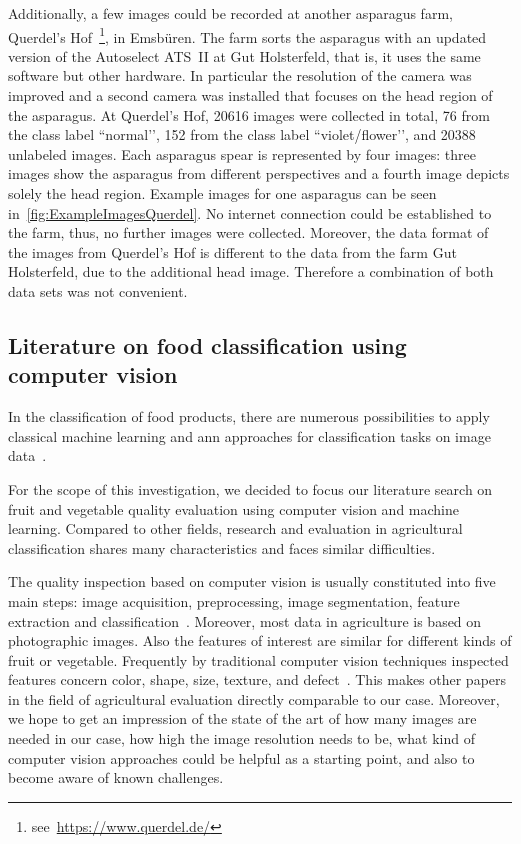 Additionally, a few images could be recorded at another asparagus farm, Querdel’s Hof~\footnote{see~\url{https://www.querdel.de/}}, in Emsb{\"u}ren. The farm sorts the asparagus with an updated version of the Autoselect ATS~II at Gut Holsterfeld, that is, it uses the same software but other hardware. In particular the resolution of the camera was improved and a second camera was installed that focuses on the head region of the asparagus. At Querdel’s Hof, 20616 images were collected in total, 76 from the class label ``normal’’, 152 from the class label ``violet/flower’’, and 20388 unlabeled images. Each asparagus spear is represented by four images: three images show the asparagus from different perspectives and a fourth image depicts solely the head region. Example images for one asparagus can be seen in~\autoref{fig:ExampleImagesQuerdel}. No internet connection could be established to the farm, thus, no further images were collected. Moreover, the data format of the images from Querdel’s Hof is different to the data from the farm Gut Holsterfeld, due to the additional head image. Therefore a combination of both data sets was not convenient. 


\subsection{Literature on food classification using computer vision}
\label{sec:Literature}

In the classification of food products, there are numerous possibilities to apply classical machine learning and \acrshort{ann} approaches for classification tasks on image data~\citep{bhargava2018fruits,brosnan2002inspection}.


For the scope of this investigation, we decided to focus our literature search on fruit and vegetable quality evaluation using computer vision and machine learning. Compared to other fields, research and evaluation in agricultural classification shares many characteristics and faces similar difficulties.

The quality inspection based on computer vision is usually constituted into five main steps: image acquisition, preprocessing, image segmentation, feature extraction and classification~\citep{bhargava2018fruits}. Moreover, most data in agriculture is based on photographic images. Also the features of interest are similar for different kinds of fruit or vegetable. Frequently by traditional computer vision techniques inspected features concern color, shape, size, texture, and defect~\citep{bhargava2018fruits}. This makes other papers in the field of agricultural evaluation directly comparable to our case. Moreover, we hope to get an impression of the state of the art of how many images are needed in our case, how high the image resolution needs to be, what kind of computer vision approaches could be helpful as a starting point,  and also to become aware of known challenges.

